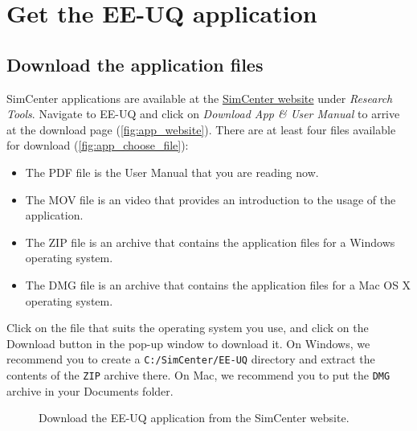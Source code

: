 \section{Get the EE-UQ application}

\subsection{Download the application files}

SimCenter applications are available at the \href{https://simcenter.designsafe-ci.org/research-tools/overview/}{SimCenter website} under \emph{Research Tools}. Navigate to EE-UQ and click on \emph{Download App \& User Manual} to arrive at the download page (\autoref{fig:app_website}). There are at least four files available for download (\autoref{fig:app_choose_file}):

\begin{itemize}
    \item The PDF file is the User Manual that you are reading now.
    \item The MOV file is an video that provides an introduction to the usage of the application.
    \item The ZIP file is an archive that contains the application files for a Windows operating system.
    \item The DMG file is an archive that contains the application files for a Mac OS X operating system.
\end{itemize}

Click on the file that suits the operating system you use, and click on the Download button in the pop-up window to download it. On Windows, we recommend you to create a \texttt{C:/SimCenter/EE-UQ} directory and extract the contents of the \texttt{ZIP} archive there. On Mac, we recommend you to put the \texttt{DMG} archive in your Documents folder.

\begin{figure}[!htbp]
  \caption{Download the EE-UQ application from the SimCenter website.}
  \label{fig:app_website}
\end{figure}


